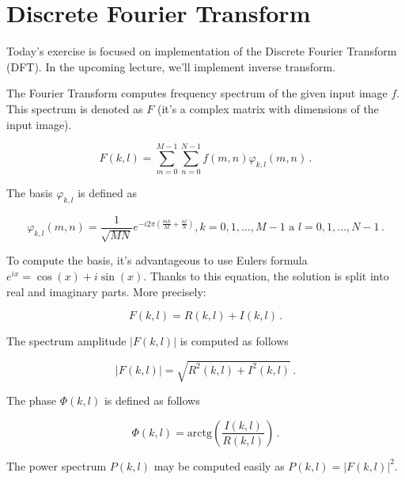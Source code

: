 \documentclass[12pt]{article}
\begin{document}
\section*{Discrete Fourier Transform}

\noindent
Today's exercise is focused on implementation of the Discrete Fourier Transform (DFT).
In the upcoming lecture, we'll implement inverse transform.

\noindent
The Fourier Transform computes frequency spectrum of the given input image $f$.
This spectrum is denoted as $F$ (it's a complex matrix with dimensions of the input image).

\begin{equation}
    F(k, l) = \sum\limits_{m=0}^{M-1} \sum\limits_{n=0}^{N-1} f(m, n) \varphi_{k, l}(m, n)\,.
\end{equation}

\noindent
The basis $\varphi_{k, l}$ is defined as

\begin{equation}
    \varphi_{k, l}(m, n) = \frac{1}{\sqrt{MN}} e^{-i 2 \pi \left( \frac{mk}{M} + \frac{nl}{N} \right) }, k = 0, 1, \dots, M-1 \,\, \mathrm{a} \,\, l = 0, 1, \dots, N-1\,.
\end{equation}

\noindent
To compute the basis, it's advantageous to use Eulers formula $e^{ix} = \cos( x ) + i \sin( x )$.
Thanks to this equation, the solution is split into real and imaginary parts. More precisely:

\begin{equation}
    F(k, l) = R(k, l) + I(k, l)\, .
\end{equation}

\noindent
The spectrum amplitude $|F(k, l)|$ is computed as follows

\begin{equation}
    |F(k, l)| = \sqrt{ R^2(k, l) + I^2(k, l)}\, .
\end{equation}

\noindent
The phase $\Phi(k, l)$ is defined as follows

\begin{equation}
    \Phi(k, l) = \mathrm{arctg}\left( \frac{I(k, l)}{R(k, l)} \right)\, .
\end{equation}

\noindent
The power spectrum $P(k, l)$ may be computed easily as $ P(k, l) = |F(k, l)|^2$.
\end{document}
